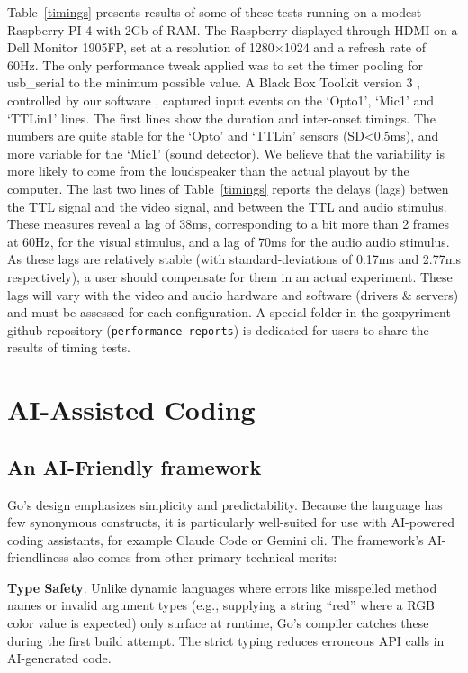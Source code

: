 \documentclass[man,a4paper]{apa7}
\begin{document}
Table~\ref{timings} presents results of some of these tests running on
a modest Raspberry PI 4 with 2Gb of RAM.  The Raspberry displayed
through HDMI on a Dell Monitor 1905FP, set at a resolution of
1280$\times$1024 and a refresh rate of 60Hz. The only performance
tweak applied was to set the timer pooling for usb\_serial to the
minimum possible value. A Black Box Toolkit version 3
\parencite{plant_2004}, controlled by our software
\parencite{Pallier_bbtkv3}, captured input events on the `Opto1',
`Mic1' and `TTLin1' lines. The first lines show the duration and
inter-onset timings.  The numbers are quite stable for the `Opto' and
`TTLin' sensors (SD<0.5ms), and more variable for the `Mic1' (sound
detector). We believe that the variability is more likely to come from the loudspeaker
than the actual playout by the computer. The last two lines of
Table~\ref{timings} reports the delays (lags) betwen the TTL signal
and the video signal, and between the TTL and audio stimulus. These
measures reveal a lag of 38ms, corresponding to a bit more than 2
frames at 60Hz, for the visual stimulus, and a lag of 70ms for the
audio audio stimulus. As these lags are relatively stable (with
standard-deviations of 0.17ms and 2.77ms respectively), a user should
compensate for them in an actual experiment. These lags will vary with
the video and audio hardware and software (drivers \& servers) and
must be assessed for each configuration. A special folder in the
goxpyriment github repository (\texttt{performance-reports}) is
dedicated for users to share the results of timing tests.

\section{AI-Assisted Coding}\label{ai-assisted}

\subsection{An AI-Friendly framework}\label{ai-friendly-api}

Go's design emphasizes simplicity and predictability. Because the
language has few synonymous constructs, it is particularly well-suited
for use with AI-powered coding assistants, for example Claude Code or
Gemini cli. The framework's AI-friendliness also comes from other
primary technical merits:

\textbf{Type Safety}. Unlike dynamic languages where errors like
misspelled method names or invalid argument types (e.g., supplying a
string ``red'' where a RGB color value is expected) only surface at
runtime, Go's compiler catches these during the first build attempt.
The strict typing reduces erroneous API calls in AI-generated code.
\end{document}
